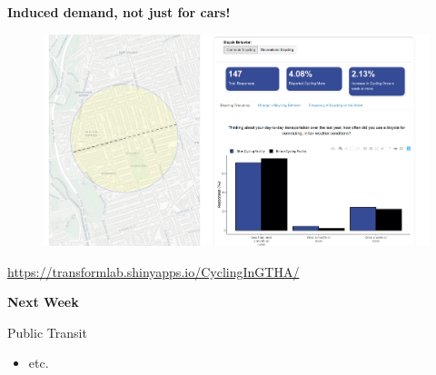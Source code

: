 \documentclass[aspectratio=169]{beamer}
\begin{document}
\begin{frame}
	
	\textbf{Induced demand, not just for cars!}
	
	\begin{figure}
		\centering
		\includegraphics[width=0.95\linewidth]{images/ryerson_cycle_danforth.png}
	\end{figure}
	
	\tiny\url{https://transformlab.shinyapps.io/CyclingInGTHA/}
	
	
\end{frame}







\begin{frame}
	\textbf{Next Week} 
	
	\vspace{4mm}
	
	Public Transit
	
	\begin{itemize}
				
		
		\item etc.
				
		
	\end{itemize}
	
\end{frame}
\end{document}
